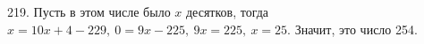219. Пусть в этом числе было $x$ десятков, тогда $x=10x+4-229,\ 0=9x-225,\ 9x=225,\ x=25.$ Значит, это число 254.\\
